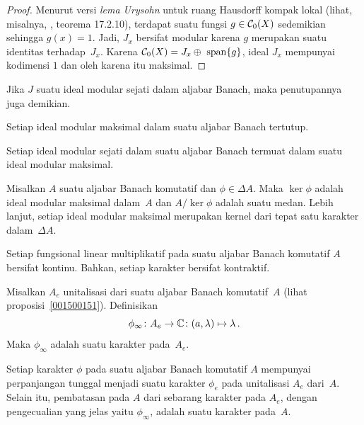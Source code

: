 \begin{proof} Menurut versi \emph{lema Urysohn} untuk ruang Hausdorff kompak lokal
(lihat, misalnya, \cite{Erdman:2007}, teorema 17.2.10), terdapat suatu fungsi $g \in
\mathcal{C}_0(X)$ sedemikian sehingga $g(x) = 1$. Jadi, $J_x$ bersifat modular karena $g$
merupakan suatu identitas terhadap~$J_x$. Karena $\mathcal{C}_0(X) = J_x \oplus\,\, \operatorname{span}\{g\}$,
ideal $J_x$ mempunyai kodimensi $1$ dan oleh karena itu maksimal.
\end{proof}

\begin{prop} Jika $J$ suatu ideal modular sejati dalam aljabar Banach, maka penutupannya
juga demikian.
\end{prop}

\begin{cor} Setiap ideal modular maksimal dalam suatu aljabar Banach tertutup.
\end{cor}

\begin{prop} Setiap ideal modular sejati dalam suatu aljabar Banach termuat dalam suatu
ideal modular maksimal.
\end{prop}

\begin{prop}\label{00150144} Misalkan $A$ suatu aljabar Banach komutatif dan $\phi \in
\Delta A$. Maka $\ker\phi$ adalah ideal modular maksimal dalam~$A$ dan $A/\ker\phi$ adalah
suatu medan. Lebih lanjut, setiap ideal modular maksimal merupakan kernel dari tepat satu
karakter dalam~$\Delta A$.
\end{prop}

\begin{prop}\label{00150147} Setiap fungsional linear multiplikatif pada suatu aljabar
Banach komutatif $A$ bersifat kontinu. Bahkan, setiap karakter bersifat kontraktif.
\end{prop}

\begin{exam} Misalkan $A_e$ unitalisasi dari suatu aljabar Banach komutatif~$A$ (lihat
proposisi~\ref{001500151}).
Definisikan
   \[ \phi_\infty\colon A_e \rightarrow \mathbb{C}\colon (a,\lambda) \mapsto \lambda\,. \]
Maka $\phi_\infty$ adalah suatu karakter pada~$A_e$.
\end{exam}

\begin{prop}\label{00150154} Setiap karakter $\phi$ pada suatu aljabar Banach komutatif
$A$ mempunyai perpanjangan tunggal menjadi suatu
karakter $\phi_e$ pada unitalisasi $A_e$ dari~$A$. Selain itu, pembatasan pada $A$ dari sebarang
karakter pada $A_e$, dengan pengecualian yang jelas yaitu $\phi_\infty$, adalah suatu
karakter pada~$A$.
\end{prop}


